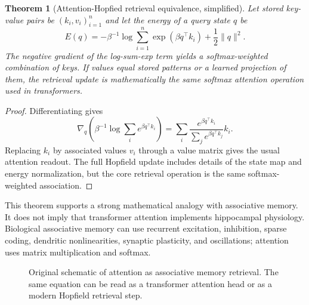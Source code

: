 \documentclass[11pt]{article}
\newtheorem{theorem}[definition]{Theorem}
\newcommand{\softmax}{\operatorname{softmax}}
\newcommand{\1}{\mathbf{1}}
\begin{document}
\begin{theorem}[Attention-Hopfied retrieval equivalence, simplified]
Let stored key-value pairs be $(k_i,v_i)_{i=1}^n$ and let the energy of a query state $q$ be
\[
E(q)=-\beta^{-1}\log\sum_{i=1}^n \exp(\beta q^\top k_i)+\frac12\|q\|^2.
\]
The negative gradient of the log-sum-exp term yields a softmax-weighted combination of keys. If values equal stored patterns or a learned projection of them, the retrieval update is mathematically the same softmax attention operation used in transformers.
\end{theorem}
\begin{proof}
Differentiating gives
\[
\nabla_q \left(\beta^{-1}\log\sum_i e^{\beta q^\top k_i}\right)=\sum_i \frac{e^{\beta q^\top k_i}}{\sum_j e^{\beta q^\top k_j}}k_i.
\]
Replacing $k_i$ by associated values $v_i$ through a value matrix gives the usual attention readout. The full Hopfield update includes details of the state map and energy normalization, but the core retrieval operation is the same softmax-weighted association.
\end{proof}

This theorem supports a strong mathematical analogy with associative memory. It does not imply that transformer attention implements hippocampal physiology. Biological associative memory can use recurrent excitation, inhibition, sparse coding, dendritic nonlinearities, synaptic plasticity, and oscillations; attention uses matrix multiplication and softmax.

\begin{figure}[H]
\centering
{}
\caption{Original schematic of attention as associative memory retrieval. The same equation can be read as a transformer attention head or as a modern Hopfield retrieval step.}
\label{fig:hopfield_attention}
\end{figure}
\end{document}
